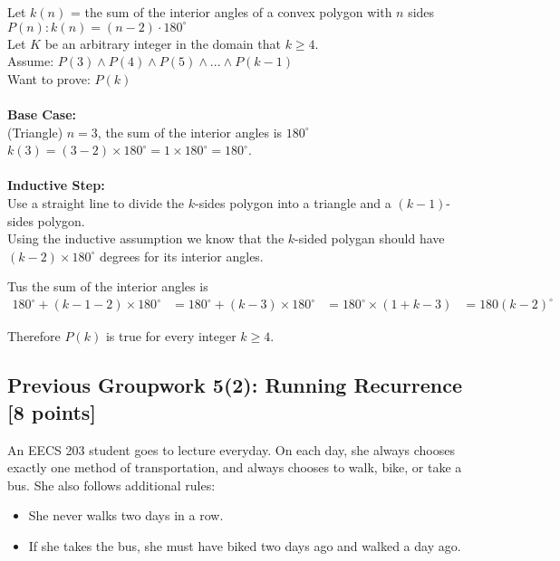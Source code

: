 \documentclass[12pt]{exam}
\begin{document}
\begin{solution}
    Let $k(n)$ = the sum of the interior angles of a convex polygon with $n$ sides\\
    $P(n): k(n) = (n-2) \cdot 180^{\circ} $\\
    Let $K$ be an arbitrary integer in the domain that $k \geq 4$.\\
    Assume: $P(3) \land P(4) \land P(5) \land ... \land P(k-1)$\\
    Want to prove: $P(k)$
    \\\\
    \textbf{Base Case:}\\
    (Triangle) $n=3$, the sum of the interior angles is $180^\circ $\\
    $k(3) = (3-2) \times 180^\circ  = 1 \times 180^\circ  = 180^\circ $.
    \\\\
    \textbf{Inductive Step:}\\
    Use a straight line to divide the $k$-sides polygon into a triangle and a $(k-1)$-sides polygon.\\
    Using the inductive assumption we know that the $k$-sided polygan should have $(k-2) \times 180^\circ $ degrees for its interior angles.

    Tus the sum of the interior angles is 
    \begin{align*}
        180^\circ  + (k-1-2) \times 180^\circ &= 180^\circ  + (k-3) \times 180^\circ 
                                              &= 180^\circ  \times (1 + k - 3) 
                                              &= 180(k-2)^\circ 
    \end{align*}

    Therefore $P(k)$ is true for every integer $k \geq 4$.
\end{solution}


\smallskip
\subsection*{Previous Groupwork 5(2): Running Recurrence [8 points]}
An EECS 203 student goes to lecture everyday. On each day, she always chooses exactly one method of transportation, and always chooses to walk, bike, or take a bus. She also follows additional rules:
\begin{itemize}
    \item She never walks two days in a row.
    \item If she takes the bus, she must have biked two days ago and walked a day ago.
\end{itemize}
\end{document}
